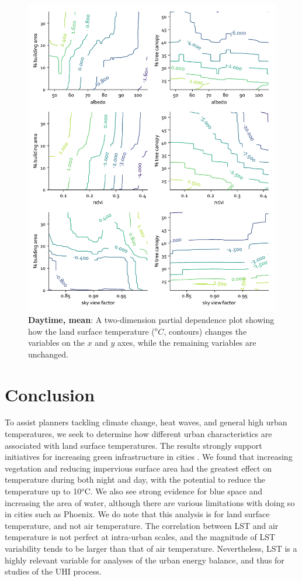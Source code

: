 \documentclass[final,3p,times,twocolumn,sort&compress]{elsarticle}
\begin{document}
\begin{figure}
    \centering
    \includegraphics[width=\linewidth]{fig/report/pdp_2d_day_100.pdf}
    \caption{
    \textbf{Daytime, mean}: A two-dimension partial dependence plot showing how the land surface temperature ($^oC$, contours) changes the variables on the $x$ and $y$ axes, while the remaining variables are unchanged.
    }
    \label{fig:pdp_2dday_100}
\end{figure}


\section{Conclusion}
To assist planners tackling climate change, heat waves, and general high urban temperatures, we seek to determine how different urban characteristics are associated with land surface temperatures. 
The results strongly support initiatives for increasing green infrastructure in cities \cite{Larsen2015-da, Meerow2017-xv}. 
We found that increasing vegetation and reducing impervious surface area had the greatest effect on temperature during both night and day, with the potential to reduce the temperature up to 10$^o$C.
We also see strong evidence for blue space and increasing the area of water, although there are various limitations with doing so in cities such as Phoenix.
We do note that this analysis is for land surface temperature, and not air temperature. 
The correlation between LST and air temperature is not perfect at intra-urban scales, and the magnitude of LST variability tends to be larger  than that of air temperature.
Nevertheless, LST is a highly relevant variable for analyses of the urban energy balance, and thus for studies of the UHI process.
\end{document}

